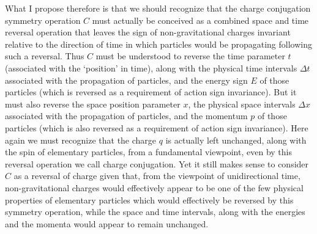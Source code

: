 \documentclass[notitlepage,12pt]{report}
\begin{document}
What I propose therefore is that we should recognize that the charge conjugation symmetry operation $C$ must actually be conceived as a combined space and time reversal operation that leaves the sign of non-gravitational charges invariant relative to the direction of time in which particles would be propagating following such a reversal. Thus $C$ must be understood to reverse the time parameter $t$ (associated with the `position' in time), along with the physical time intervals $\Delta t$ associated with the propagation of particles, and the energy sign $E$ of those particles (which is reversed as a requirement of action sign invariance). But it must also reverse the space position parameter $x$, the physical space intervals $\Delta x$ associated with the propagation of particles, and the momentum $p$ of those particles (which is also reversed as a requirement of action sign invariance). Here again we must recognize that the charge $q$ is actually left unchanged, along with the spin of elementary particles, from a fundamental viewpoint, even by this reversal operation we call charge conjugation. Yet it still makes sense to consider $C$ as a reversal of charge given that, from the viewpoint of unidirectional time, non-gravitational charges would effectively appear to be one of the few physical properties of elementary particles which would effectively be reversed by this symmetry operation, while the space and time intervals, along with the energies and the momenta would appear to remain unchanged.
\end{document}
